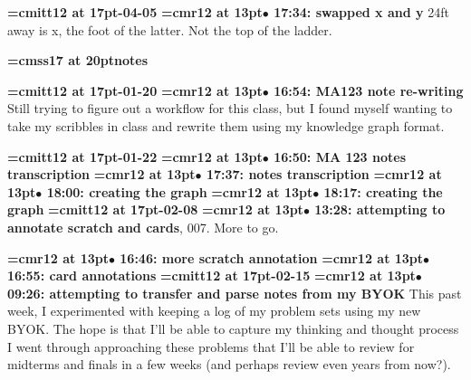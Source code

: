 {\medskip\noindent\bf\font\titlefont=cmitt12 at 17pt-04-05}\medskip
{\smallskip\noindent\bf\font\titlefont=cmr12 at 13pt\titlefont $\bullet$ 17:34: swapped x and y}\smallskip
24ft away is x, the foot of the latter. Not the top of the ladder.
\par

{\medskip\noindent\bf\font\titlefont=cmss17 at 20pt\titlefont notes}\medskip

{\medskip\noindent\bf\font\titlefont=cmitt12 at 17pt-01-20}\medskip
{\smallskip\noindent\bf\font\titlefont=cmr12 at 13pt\titlefont $\bullet$ 16:54: MA123 note re-writing}\smallskip
Still trying to figure out a workflow for this class, but I found myself wanting to take my scribbles in class and rewrite them using my knowledge graph format.
\par

{\medskip\noindent\bf\font\titlefont=cmitt12 at 17pt-01-22}\medskip
{\smallskip\noindent\bf\font\titlefont=cmr12 at 13pt\titlefont $\bullet$ 16:50: MA 123 notes transcription}\smallskip
{\smallskip\noindent\bf\font\titlefont=cmr12 at 13pt\titlefont $\bullet$ 17:37: notes transcription}\smallskip
{\smallskip\noindent\bf\font\titlefont=cmr12 at 13pt\titlefont $\bullet$ 18:00: creating the graph}\smallskip
{\smallskip\noindent\bf\font\titlefont=cmr12 at 13pt\titlefont $\bullet$ 18:17: creating the graph}\smallskip
{\medskip\noindent\bf\font\titlefont=cmitt12 at 17pt-02-08}\medskip
{\smallskip\noindent\bf\font\titlefont=cmr12 at 13pt\titlefont $\bullet$ 13:28: attempting to annotate scratch and cards}, 007. More to go.
\par

{\smallskip\noindent\bf\font\titlefont=cmr12 at 13pt\titlefont $\bullet$ 16:46: more scratch annotation}\smallskip
{\smallskip\noindent\bf\font\titlefont=cmr12 at 13pt\titlefont $\bullet$ 16:55: card annotations}\smallskip
{\medskip\noindent\bf\font\titlefont=cmitt12 at 17pt-02-15}\medskip
{\smallskip\noindent\bf\font\titlefont=cmr12 at 13pt\titlefont $\bullet$ 09:26: attempting to transfer and parse notes from my BYOK}\smallskip
This past week, I experimented with keeping a log of my problem sets using my new BYOK. The hope is that I'll be able to capture my thinking and thought process I went through approaching these problems that I'll be able to review for midterms and finals in a few weeks (and perhaps review even years from now?).
\par

